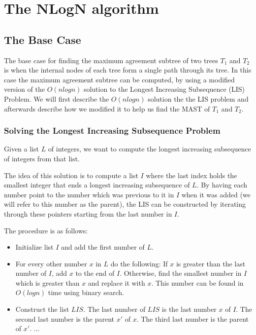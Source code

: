 \chapter{The NLogN algorithm}

\section{The Base Case}
The base case for finding the maximum agreement subtree of two trees $T_1$ and $T_2$ is when the internal nodes of each tree form a single path through its tree. In this case the maximum agreement subtree can be computed, by using a modified version of the $O(nlogn)$ solution to the Longest Increasing Subsequence (LIS) Problem. We will first describe the $O(nlogn)$ solution the the LIS problem and afterwards describe how we modified it to help us find the MAST of $T_1$ and $T_2$.

\subsection{Solving the Longest Increasing Subsequence Problem}
Given a list $L$ of integers, we want to compute the longest increasing subsequence of integers from that list.


The idea of this solution is to compute a list $I$ where the last index holds the smallest integer that ends a longest increasing subsequence of $L$. By having each number point to the number which was previous to it in $I$ when it was added (we will refer to this number as the parent), the LIS can be constructed by iterating through these pointers starting from the last number in $I$.

The procedure is as follows:

\begin{itemize}
	\item Initialize list $I$ and add the first number of $L$.
	\item For every other number $x$ in $L$ do the following:
	\subitem If $x$ is greater than the last number of $I$, add $x$ to the end of $I$.
	\subitem Otherwise, find the smallest number in $I$ which is greater than $x$ and replace it with $x$. This number can be found in $O(logn)$ time using binary search.
	\item Construct the list $LIS$.
	\subitem The last number of $LIS$ is the last number $x$ of $I$.
	\subitem The second last number is the parent $x'$ of $x$.
	\subitem The third last number is the parent of $x'$.
	\subitem ...
\end{itemize}

